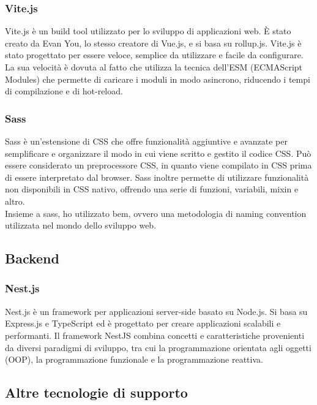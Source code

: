 \subsubsection{Vite.js}\label{subsubsec:vite}
Vite.js è un build tool utilizzato per lo sviluppo di applicazioni web. È stato creato da Evan You, lo stesso creatore di Vue.js, e si basa su rollup.js.
Vite.js è stato progettato per essere veloce, semplice da utilizzare e facile da configurare. La sua velocità è dovuta al fatto che utilizza la tecnica dell'ESM (ECMAScript Modules) 
che permette di caricare i moduli in modo asincrono, riducendo i tempi di compilazione e di hot-reload.
\subsubsection{Sass}\label{subsubsec:sass}
Sass è un'estensione di CSS che offre funzionalità aggiuntive e avanzate per semplificare e organizzare il modo in cui viene scritto e gestito il codice CSS.
Può essere considerato un preprocessore CSS, in quanto viene compilato in CSS prima di essere interpretato dal browser. Sass inoltre permette di utilizzare funzionalità non disponibili in CSS nativo, offrendo una serie di funzioni, variabili, mixin e altro.\\
Insieme a sass, ho utilizzato bem, ovvero una metodologia di naming convention utilizzata nel mondo dello sviluppo web.

\subsection{Backend}\label{subsec:backend}
\subsubsection{Nest.js}\label{subsubsec:nest}
Nest.js è un framework per applicazioni server-side basato su Node.js. Si basa su Express.js e TypeScript ed è progettato per creare applicazioni scalabili e performanti.
Il framework NestJS combina concetti e caratteristiche provenienti da diversi paradigmi di sviluppo, tra cui la programmazione orientata agli oggetti (OOP), la programmazione funzionale e la programmazione reattiva.

\subsection{Altre tecnologie di supporto}\label{subsec:altre-tecnologie-di-supporto}
